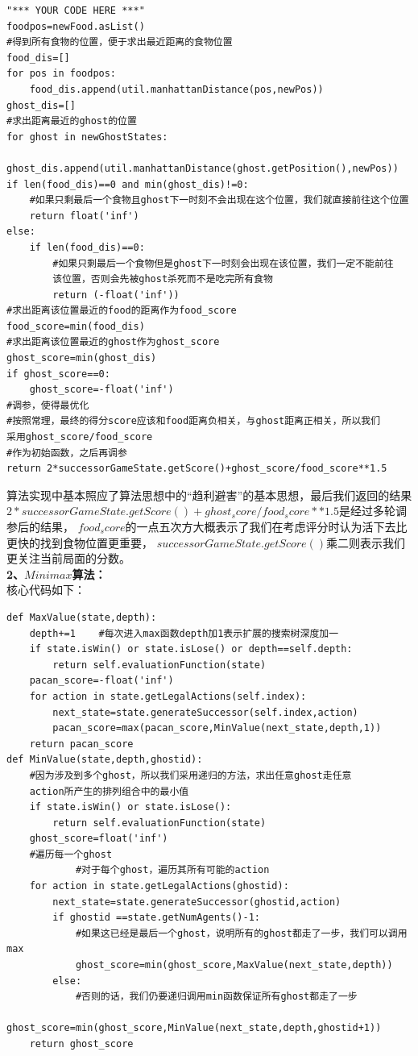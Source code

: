\documentclass[a4paper,12pt,UTF8]{article}
\begin{document}
\begin{flushleft}
{{\begin{lstlisting}
"*** YOUR CODE HERE ***"
foodpos=newFood.asList()
#得到所有食物的位置，便于求出最近距离的食物位置
food_dis=[]
for pos in foodpos:
    food_dis.append(util.manhattanDistance(pos,newPos))
ghost_dis=[]
#求出距离最近的ghost的位置
for ghost in newGhostStates:
    ghost_dis.append(util.manhattanDistance(ghost.getPosition(),newPos))
if len(food_dis)==0 and min(ghost_dis)!=0:
    #如果只剩最后一个食物且ghost下一时刻不会出现在这个位置，我们就直接前往这个位置
    return float('inf')
else:
    if len(food_dis)==0:
        #如果只剩最后一个食物但是ghost下一时刻会出现在该位置，我们一定不能前往
        该位置，否则会先被ghost杀死而不是吃完所有食物
        return (-float('inf'))
#求出距离该位置最近的food的距离作为food_score
food_score=min(food_dis) 
#求出距离该位置最近的ghost作为ghost_score
ghost_score=min(ghost_dis)
if ghost_score==0:
    ghost_score=-float('inf')
#调参，使得最优化
#按照常理，最终的得分score应该和food距离负相关，与ghost距离正相关，所以我们
采用ghost_score/food_score
#作为初始函数，之后再调参
return 2*successorGameState.getScore()+ghost_score/food_score**1.5
        \end{lstlisting}
    }
    \normalsize{
        \hspace{1cm}算法实现中基本照应了算法思想中的“趋利避害”的基本思想，最后我们返回的结果
        $2*successorGameState.getScore()+ghost_score/food_score**1.5$是经过多轮调参后的结果，
        $food_score$的一点五次方大概表示了我们在考虑评分时认为活下去比更快的找到食物位置更重要，
        $successorGameState.getScore()$乘二则表示我们更关注当前局面的分数。\\
    }
    \large{
        \hspace{1cm}\textbf{2、$Minimax$算法：\\}
    }
    \normalsize{
        \hspace{1cm}核心代码如下：\\
    }
    \scriptsize{
        \begin{lstlisting}
def MaxValue(state,depth):
    depth+=1    #每次进入max函数depth加1表示扩展的搜索树深度加一
    if state.isWin() or state.isLose() or depth==self.depth:
        return self.evaluationFunction(state)
    pacan_score=-float('inf')
    for action in state.getLegalActions(self.index):
        next_state=state.generateSuccessor(self.index,action)
        pacan_score=max(pacan_score,MinValue(next_state,depth,1))
    return pacan_score
def MinValue(state,depth,ghostid):
    #因为涉及到多个ghost，所以我们采用递归的方法，求出任意ghost走任意
    action所产生的排列组合中的最小值
    if state.isWin() or state.isLose():
        return self.evaluationFunction(state)
    ghost_score=float('inf')
    #遍历每一个ghost         
            #对于每个ghost，遍历其所有可能的action
    for action in state.getLegalActions(ghostid):
        next_state=state.generateSuccessor(ghostid,action)
        if ghostid ==state.getNumAgents()-1:
            #如果这已经是最后一个ghost，说明所有的ghost都走了一步，我们可以调用max
            ghost_score=min(ghost_score,MaxValue(next_state,depth))
        else:
            #否则的话，我们仍要递归调用min函数保证所有ghost都走了一步
            ghost_score=min(ghost_score,MinValue(next_state,depth,ghostid+1))
    return ghost_score


\end{lstlisting}}}
\end{flushleft}
\end{document}
